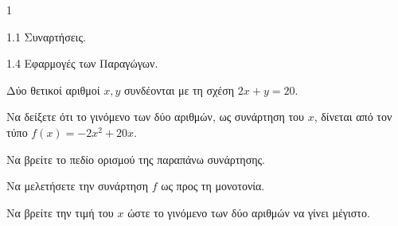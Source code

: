 \begin{ylh}{1}
    \item 1.1 Συναρτήσεις.
    \item 1.4 Εφαρμογές των Παραγώγων.
\end{ylh}
Δύο θετικοί αριθμοί $x, y$ συνδέονται με τη σχέση $2x + y = 20$.
\begin{alist}
    \item 
    \begin{rlist}
        \item Να δείξετε ότι το γινόμενο των δύο αριθμών, ως συνάρτηση του $x$, δίνεται από τον τύπο $f(x) = -2x^2 + 20x$. 
        \item Να βρείτε το πεδίο ορισμού της παραπάνω συνάρτησης. 
    \end{rlist}
    \item Να μελετήσετε την συνάρτηση $f$ ως προς τη μονοτονία. 
    \item Να βρείτε την τιμή του $x$ ώστε το γινόμενο των δύο αριθμών να γίνει μέγιστο. 
\end{alist}

